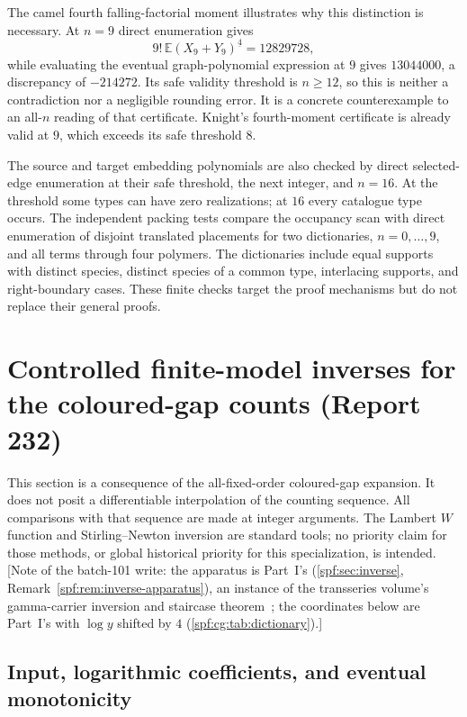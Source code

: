 \documentclass[11pt]{article}
\numberwithin{equation}{section}
\theoremstyle{definition}
\theoremstyle{remark}
\theoremstyle{definition}
\newcommand{\E}{\mathbb E}
\newcommand{\fall}[2]{{#1}^{\underline{#2}}}
\begin{document}
The camel fourth falling-factorial moment illustrates why this distinction
is necessary. At $n=9$ direct enumeration gives
\begin{equation}
 9!\,\E\fall{(X_9+Y_9)}4=12829728,
 \label{spf:cg:eq:counterexample}
\end{equation}
while evaluating the eventual graph-polynomial expression at $9$ gives
$13044000$, a discrepancy of $-214272$. Its safe validity threshold is
$n\ge12$, so this is neither a contradiction nor a negligible rounding
error. It is a concrete counterexample to an all-$n$ reading of that
certificate. Knight's fourth-moment certificate is already valid at $9$,
which exceeds its safe threshold $8$.

The source and target embedding polynomials are also checked by direct
selected-edge enumeration at their safe threshold, the next integer, and
$n=16$. At the threshold some types can have zero realizations; at $16$
every catalogue type occurs. The independent packing tests compare the
occupancy scan with direct enumeration of disjoint translated placements
for two dictionaries, $n=0,\ldots,9$, and all terms through four polymers.
The dictionaries include equal supports with distinct species, distinct
species of a common type, interlacing supports, and right-boundary cases.
These finite checks target the proof mechanisms but do not replace their
general proofs.

\section{Controlled finite-model inverses for the coloured-gap counts (Report 232)}
\label{spf:cg:sec:coloured-inverses}

This section is a consequence of the all-fixed-order coloured-gap expansion.
It does not posit a differentiable interpolation of the counting sequence.
All comparisons with that sequence are made at integer arguments.
The Lambert $W$ function and Stirling--Newton inversion are standard tools;
no priority claim for those methods, or global historical priority for this
specialization, is intended. [Note of the batch-101 write: the apparatus is
Part~I's (\cref{spf:sec:inverse}, Remark~\ref{spf:rem:inverse-apparatus}), an
instance of the transseries volume's gamma-carrier inversion and staircase
theorem~\cite{tai}; the coordinates below are Part~I's with $\log y$ shifted
by $4$ (\cref{spf:cg:tab:dictionary}).]

\subsection{Input, logarithmic coefficients, and eventual monotonicity}
\end{document}
